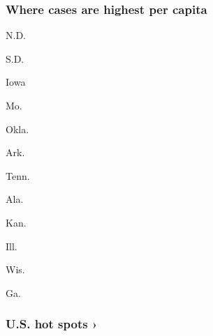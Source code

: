 \href{https://www.nytimes3xbfgragh.onion/interactive/2020/us/coronavirus-us-cases.html}{}

\hypertarget{where-cases-are-highest-per-capita}{%
\subsubsection{\texorpdfstring{Where cases are \textbf{highest} per
capita}{Where cases are highest per capita}}\label{where-cases-are-highest-per-capita}}

\href{https://www.nytimes3xbfgragh.onion/interactive/2020/us/north-dakota-coronavirus-cases.html}{}

N.D.
\href{https://www.nytimes3xbfgragh.onion/interactive/2020/us/south-dakota-coronavirus-cases.html}{}

S.D.
\href{https://www.nytimes3xbfgragh.onion/interactive/2020/us/iowa-coronavirus-cases.html}{}

Iowa
\href{https://www.nytimes3xbfgragh.onion/interactive/2020/us/missouri-coronavirus-cases.html}{}

Mo.
\href{https://www.nytimes3xbfgragh.onion/interactive/2020/us/oklahoma-coronavirus-cases.html}{}

Okla.
\href{https://www.nytimes3xbfgragh.onion/interactive/2020/us/arkansas-coronavirus-cases.html}{}

Ark.
\href{https://www.nytimes3xbfgragh.onion/interactive/2020/us/tennessee-coronavirus-cases.html}{}

Tenn.
\href{https://www.nytimes3xbfgragh.onion/interactive/2020/us/alabama-coronavirus-cases.html}{}

Ala.
\href{https://www.nytimes3xbfgragh.onion/interactive/2020/us/kansas-coronavirus-cases.html}{}

Kan.
\href{https://www.nytimes3xbfgragh.onion/interactive/2020/us/illinois-coronavirus-cases.html}{}

Ill.
\href{https://www.nytimes3xbfgragh.onion/interactive/2020/us/wisconsin-coronavirus-cases.html}{}

Wis.
\href{https://www.nytimes3xbfgragh.onion/interactive/2020/us/georgia-coronavirus-cases.html}{}

Ga.

\href{https://www.nytimes3xbfgragh.onion/interactive/2020/us/coronavirus-us-cases.html}{}

\hypertarget{us-hot-spots-}{%
\subsubsection{U.S. hot spots ›}\label{us-hot-spots-}}

